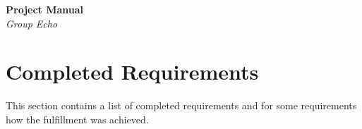 \documentclass{article}
\begin{document}
\begin{titlepage}
   \begin{center}
      \Large\textbf{Project Manual}\\
      \large\textit{Group Echo}
   \end{center}
\end{titlepage}

\tableofcontents

\newpage

\section{Completed Requirements}
This section contains a list of completed requirements and for some requirements how the fulfillment was achieved.
\end{document}

